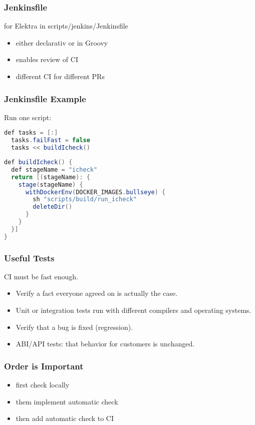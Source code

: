 \begin{frame}
	\frametitle{Jenkinsfile}

	for Elektra in scripts/jenkins/Jenkinsfile

	\begin{itemize}[<+-| alert@+>]

	\item either declarativ or in Groovy
	\item enables review of CI
	\item different CI for different PRs
	\end{itemize}
\end{frame}

\begin{frame}[fragile]
	\frametitle{Jenkinsfile Example}

	Run one script:
	\begin{lstlisting}[language=Java]
  def tasks = [:]
  tasks.failFast = false
  tasks << buildIcheck()
\end{lstlisting}

	\begin{lstlisting}[language=Java]
def buildIcheck() {
  def stageName = "icheck"
  return [(stageName): {
    stage(stageName) {
      withDockerEnv(DOCKER_IMAGES.bullseye) {
        sh "scripts/build/run_icheck"
        deleteDir()
      }
    }
  }]
}
\end{lstlisting}
\end{frame}

\begin{frame}
	\frametitle{Useful Tests}

	\begin{problem}
	CI must be fast enough.
	\end{problem}

	\begin{itemize}[<+-| alert@+>]

	\item Verify a fact everyone agreed on is actually the case.
	\item Unit or integration tests run with different compilers and operating systems.
	\item Verify that a bug is fixed (regression).
	\item ABI/API tests: that behavior for customers is unchanged.
	\end{itemize}
\end{frame}

\begin{frame}
	\frametitle{Order is Important}

	\begin{itemize}[<+-| alert@+>]

	\item first check locally
	\item them implement automatic check
	\item then add automatic check to CI
	\end{itemize}
\end{frame}

